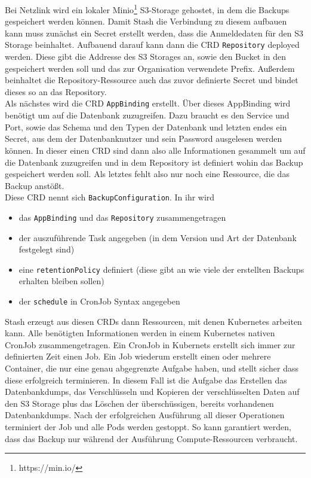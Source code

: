 Bei Netzlink wird ein lokaler Minio\footnote{https://min.io/} \ac{S3}-Storage gehostet, in dem die Backups gespeichert werden können.
Damit Stash die Verbindung zu diesem aufbauen kann muss zunächst ein Secret erstellt werden, dass die Anmeldedaten für den \ac{S3} Storage beinhaltet.
Aufbauend darauf kann dann die \ac{CRD} \texttt{Repository} deployed werden. 
Diese gibt die Addresse des \ac{S3} Storages an, sowie den Bucket in den gespeichert werden soll und das zur Organisation verwendete Prefix.
Außerdem beinhaltet die Repository-Ressource auch das zuvor definierte Secret und bindet dieses so an das Repository.
\\
Als nächstes wird die \ac{CRD} \texttt{AppBinding} erstellt. 
Über dieses AppBinding wird benötigt um auf die Datenbank zuzugreifen. 
Dazu braucht es den Service und Port, sowie das Schema und den Typen der Datenbank und letzten endes ein Secret, aus dem der Datenbanknutzer und sein Password ausgelesen werden können.
In dieser einen \ac{CRD} sind dann also alle Informationen gesammelt um auf die Datenbank zuzugreifen und in dem Repository ist definiert wohin das Backup gespeichert werden soll.
Als letztes fehlt also nur noch eine Ressource, die das Backup anstößt.
\\
Diese \ac{CRD} nennt sich \texttt{BackupConfiguration}. 
In ihr wird 
\begin{itemize}
    \item das \texttt{AppBinding} und das \texttt{Repository} zusammengetragen
    \item der auszuführende Task angegeben (in dem Version und Art der Datenbank festgelegt sind)
    \item eine \texttt{retentionPolicy} definiert (diese gibt an wie viele der erstellten Backups erhalten bleiben sollen)
    \item der \texttt{schedule} in CronJob Syntax angegeben
\end{itemize}
Stash erzeugt aus diesen \ac{CRD}s dann Ressourcen, mit denen Kubernetes arbeiten kann.
Alle benötigten Informationen werden in einem Kubernetes nativen CronJob zusammengetragen.
Ein CronJob in Kubernets erstellt sich immer zur definierten Zeit einen Job. 
Ein Job wiederum erstellt einen oder mehrere Container, die nur eine genau abgegrenzte Aufgabe haben, und stellt sicher dass diese erfolgreich terminieren. 
In diesem Fall ist die Aufgabe das Erstellen das Datenbankdumps, das Verschlüsseln und Kopieren der verschlüsselten Daten auf den \ac{S3} Storage plus das Löschen der überschüssigen, bereits vorhandenen Datenbankdumps.
Nach der erfolgreichen Ausführung all dieser Operationen terminiert der Job und alle Pods werden gestoppt. 
So kann garantiert werden, dass das Backup nur während der Ausführung Compute-Ressourcen verbraucht. 

